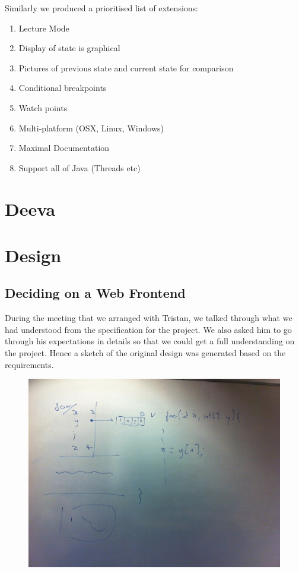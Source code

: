 \documentclass[11pt, a4paper]{article}
\begin{document}
Similarly we produced a prioritised list of extensions:

\begin{enumerate}
\item Lecture Mode
\item Display of state is graphical
\item Pictures of previous state and current state for comparison
\item Conditional breakpoints
\item Watch points
\item Multi-platform (OSX, Linux, Windows)
\item Maximal Documentation
\item Support all of Java (Threads etc)
\end{enumerate}


\section{Deeva}


\section{Design}
\subsection{Deciding on a Web Frontend}
During the meeting that we arranged with Tristan, we talked through what we had understood from the specification for the project.
We also asked him to go through his expectations in details so that we could get a full understanding on the project.
Hence a sketch of the original design was generated based on the requirements. 
\begin{figure}[h!]
\centering
\includegraphics[width=\textwidth]{sketch.jpg}
\end{figure}
\end{document}
